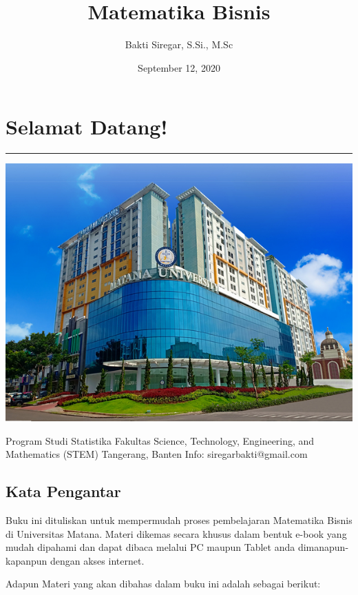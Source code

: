 \documentclass[
]{book}
\title{Matematika Bisnis}
\author{Bakti Siregar, S.Si., M.Sc}
\date{September 12, 2020}
\begin{document}
\maketitle

{
\setcounter{tocdepth}{1}
\tableofcontents
}
\hypertarget{selamat-datang}{%
\chapter*{Selamat Datang!}\label{selamat-datang}}

\begin{center}\rule{0.5\linewidth}{0.5pt}\end{center}

\begin{center}\includegraphics[width=0.5\linewidth]{images/cover} \end{center}

Program Studi Statistika
Fakultas Science, Technology, Engineering, and Mathematics (STEM)
Tangerang, Banten
Info: siregarbakti@gmail.com

\hypertarget{kata-pengantar}{%
\section*{Kata Pengantar}\label{kata-pengantar}}

Buku ini dituliskan untuk mempermudah proses pembelajaran Matematika Bisnis di Universitas Matana. Materi dikemas secara khusus dalam bentuk e-book yang mudah dipahami dan dapat dibaca melalui PC maupun Tablet anda dimanapun-kapanpun dengan akses internet.

Adapun Materi yang akan dibahas dalam buku ini adalah sebagai berikut:
\end{document}
